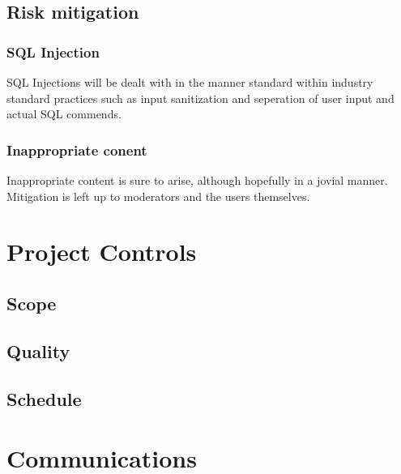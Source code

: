 \documentclass[a4paper, 12pt]{article}
\begin{document}
		\subsection{Risk mitigation}
			\subsubsection{SQL Injection}
				SQL Injections will be dealt with in the manner standard within industry standard practices such as input sanitization
				and seperation of user input and actual SQL commends. 
			\subsubsection{Inappropriate conent}
				Inappropriate content is sure to arise, although hopefully in a jovial manner. Mitigation is left up to moderators and the
				users themselves.

	\newpage
	\section{Project Controls}
		\subsection{Scope}

		\subsection{Quality}

		\subsection{Schedule}

	\newpage
	\section{Communications}
\end{document}
